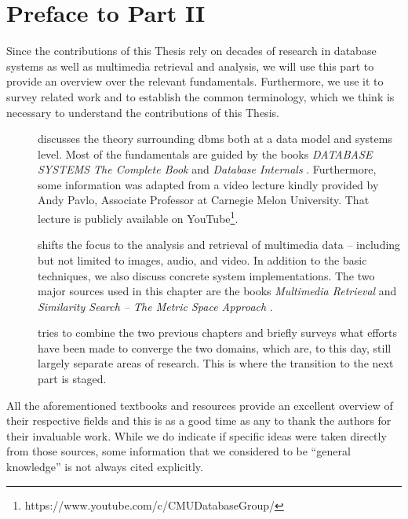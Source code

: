\chapter*{Preface to Part II}

Since the contributions of this Thesis rely on decades of research in database systems as well as multimedia retrieval and analysis, we will use this part to provide an overview over the relevant fundamentals. Furthermore, we use it to survey related work and to establish the common terminology, which we think is necessary to understand the contributions of this Thesis.

\begin{description}
    \item[] discusses the theory surrounding \acrlong{dbms} both at a data model and systems level. Most of the fundamentals are guided by the books \emph{DATABASE SYSTEMS The Complete Book} \cite{Garcia:2009Database} and \emph{Database Internals} \cite{Petrov:2019Database}. Furthermore, some information was adapted from a video lecture kindly provided by Andy Pavlo, Associate Professor at Carnegie Melon University. That lecture is publicly available on YouTube\footnote{https://www.youtube.com/c/CMUDatabaseGroup/}.
    \item[] shifts the focus to the analysis and retrieval of multimedia data -- including but not limited to images, audio, and video. In addition to the basic techniques, we also discuss concrete system implementations. The two major sources used in this chapter are the books \emph{Multimedia Retrieval} \cite{Blanken:2007multimedia} and \emph{Similarity Search -- The Metric Space Approach} \cite{Zezula:2006Similarity}.
    \item[] tries to combine the two previous chapters and briefly surveys what efforts have been made to converge the two domains, which are, to this day, still largely separate areas of research. This is where the transition to the next part is staged.
\end{description}

All the aforementioned textbooks and resources provide an excellent overview of their respective fields and this is as a good time as any to thank the authors for their invaluable work. While we do indicate if specific ideas were taken directly from those sources, some information that we considered to be ``general knowledge'' is not always cited explicitly.